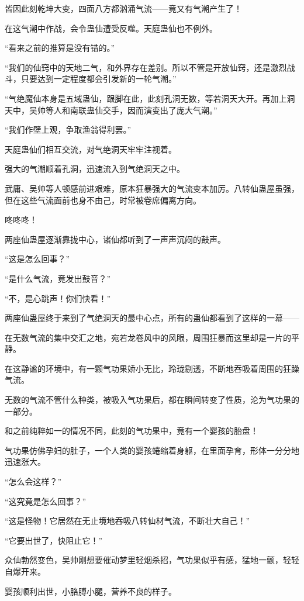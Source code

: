 \begin{this_body}
皆因此刻乾坤大变，四面八方都汹涌气流——竟又有气潮产生了！

在这气潮中作战，会令蛊仙遭受反噬。天庭蛊仙也不例外。

“看来之前的推算是没有错的。”

“我们的仙窍中的天地二气，和外界存在差别。所以不管是开放仙窍，还是激烈战斗，只要达到一定程度都会引发新的一轮气潮。”

“气绝魔仙本身是五域蛊仙，跟脚在此，此刻孔洞无数，等若洞天大开。再加上洞天中，吴帅等人和南联蛊仙交手，因而演变出了庞大气潮。”

“我们作壁上观，争取渔翁得利罢。”

天庭蛊仙们相互交流，对气绝洞天牢牢注视着。

强大的气潮顺着孔洞，迅速流入到气绝洞天之中。

武庸、吴帅等人顿感前进艰难，原本狂暴强大的气流变本加厉。八转仙蛊屋虽强，但在这些气流面前也身不由己，时常被卷席偏离方向。

咚咚咚！

两座仙蛊屋逐渐靠拢中心，诸仙都听到了一声声沉闷的鼓声。

“这是怎么回事？”

“是什么气流，竟发出鼓音？”

“不，是心跳声！你们快看！”

两座仙蛊屋终于来到了气绝洞天的最中心点，所有的蛊仙都看到了这样的一幕——

在无数气流的集中交汇之地，宛若龙卷风中的风眼，周围狂暴而这里却是一片的平静。

在这静谧的环境中，有一颗气功果娇小无比，玲珑剔透，不断地吞吸着周围的狂躁气流。

无数的气流不管什么种类，被吸入气功果后，都在瞬间转变了性质，沦为气功果的一部分。

和之前纯粹如一的情况不同，此刻的气功果中，竟有一个婴孩的胎盘！

气功果仿佛孕妇的肚子，一个人类的婴孩蜷缩着身躯，在里面孕育，形体一分分地迅速涨大。

“怎么会这样？”

“这究竟是怎么回事？”

“这是怪物！它居然在无止境地吞吸八转仙材气流，不断壮大自己！”

“它要出世了，快阻止它！”

众仙勃然变色，吴帅刚想要催动梦里轻烟杀招，气功果似乎有感，猛地一颤，轻轻自爆开来。

婴孩顺利出世，小胳膊小腿，营养不良的样子。


\end{this_body}
